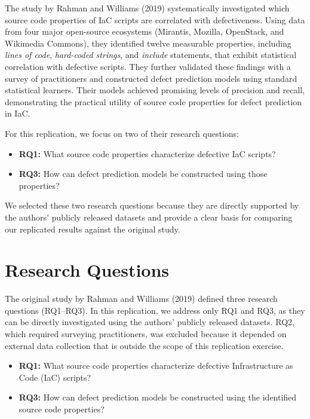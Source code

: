 \documentclass[conference]{IEEEtran}
\begin{document}
	The study by Rahman and Williams (2019) systematically investigated which source code properties of IaC scripts are correlated with defectiveness. Using data from four major open-source ecosystems (Mirantis, Mozilla, OpenStack, and Wikimedia Commons), they identified twelve measurable properties, including \emph{lines of code}, \emph{hard-coded strings}, and \emph{include} statements, that exhibit statistical correlation with defective scripts. They further validated these findings with a survey of practitioners and constructed defect prediction models using standard statistical learners. Their models achieved promising levels of precision and recall, demonstrating the practical utility of source code properties for defect prediction in IaC.
	
	For this replication, we focus on two of their research questions:
	\begin{itemize}
		\item \textbf{RQ1:} What source code properties characterize defective IaC scripts?
		\item \textbf{RQ3:} How can defect prediction models be constructed using those properties?
	\end{itemize}
	We selected these two research questions because they are directly supported by the authors' publicly released datasets and provide a clear basis for comparing our replicated results against the original study.
	
	\section{Research Questions}
	The original study by Rahman and Williams (2019) defined three research questions (RQ1–RQ3). 
	In this replication, we address only RQ1 and RQ3, as they can be directly investigated using the authors’ publicly released datasets. 
	RQ2, which required surveying practitioners, was excluded because it depended on external data collection that is outside the scope of this replication exercise.
	
	\begin{itemize}
		\item \textbf{RQ1:} What source code properties characterize defective Infrastructure as Code (IaC) scripts?
		\item \textbf{RQ3:} How can defect prediction models be constructed using the identified source code properties?
	\end{itemize}
	
\end{document}
